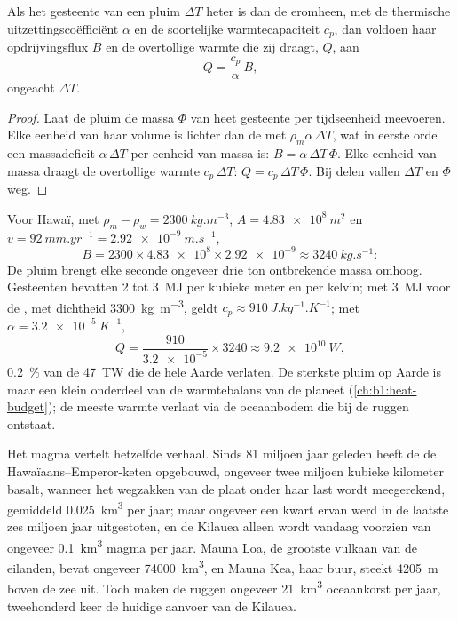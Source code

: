 \begin{proposition}\label{prop:b1:hotspots:heat}
Als het gesteente van een pluim $\Delta T$ heter is dan de  eromheen, met de thermische uitzettingscoëfficiënt $\alpha$ en de soortelijke warmtecapaciteit $c_p$, dan voldoen haar opdrijvingsflux $B$ en de overtollige warmte die zij draagt, $Q$, aan
\[
  Q = \frac{c_p}{\alpha}\,B ,
\]
ongeacht $\Delta T$.
\end{proposition}

\begin{proof}
Laat de pluim de massa $\Phi$ van heet gesteente per tijdseenheid meevoeren. Elke eenheid van haar volume is lichter dan de  met $\rho_m\alpha\,\Delta T$, wat in eerste orde een massadeficit $\alpha\,\Delta T$ per eenheid van massa is: $B =
\alpha\,\Delta T\,\Phi$. Elke eenheid van massa draagt de overtollige warmte
$c_p\,\Delta T$: $Q = c_p\,\Delta T\,\Phi$. Bij delen vallen $\Delta T$ en $\Phi$
weg.
\end{proof}

Voor Hawaï, met $\rho_m - \rho_w = \qty{2300}{kg.m^{-3}}$, $A =
\qty{4.83e8}{m^2}$ en $v = \qty{92}{mm.yr^{-1}} = \qty{2.92e-9}{m.s^{-1}}$,
\[
  B = 2300\times\num{4.83e8}\times\num{2.92e-9} \approx \qty{3240}{kg.s^{-1}}:
\]
De pluim brengt elke seconde ongeveer drie ton ontbrekende massa omhoog. Gesteenten bevatten 2 tot \qty{3}{MJ} per kubieke meter en per kelvin; met \qty{3}{MJ}
voor de , met dichtheid \qty{3300}{kg.m^{-3}}, geldt
$c_p \approx \qty{910}{J.kg^{-1}.K^{-1}}$;
met $\alpha = \qty{3.2e-5}{K^{-1}}$,
\[
  Q = \frac{910}{\num{3.2e-5}}\times3240 \approx \qty{9.2e10}{W},
\]
\qty{0.2}{\percent} van de \qty{47}{TW} die de hele Aarde verlaten. De sterkste pluim op Aarde is maar een klein onderdeel van de warmtebalans van de planeet (\cref{ch:b1:heat-budget}); de meeste warmte verlaat via de oceaanbodem die bij de ruggen ontstaat.

Het magma vertelt hetzelfde verhaal. Sinds 81 miljoen jaar geleden heeft de  de Hawaïaans–Emperor-keten opgebouwd, ongeveer twee miljoen kubieke kilometer basalt, wanneer het wegzakken van de plaat onder haar last wordt meegerekend, gemiddeld \qty{0.025}{km^3} per jaar; maar ongeveer een kwart ervan werd in de laatste zes miljoen jaar uitgestoten, en de Kilauea alleen wordt vandaag voorzien van ongeveer \qty{0.1}{km^3} magma per jaar. Mauna Loa, de grootste vulkaan van de eilanden, bevat ongeveer \qty{74000}{km^3}, en Mauna Kea, haar buur, steekt \qty{4205}{m} boven de zee uit. Toch maken de ruggen ongeveer \qty{21}{km^3} oceaankorst per jaar, tweehonderd keer de huidige aanvoer van de Kilauea.

